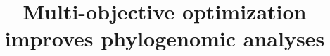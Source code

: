 \documentclass[runningheads]{llncs}
\begin{document}
%
\title{ Multi-objective optimization improves phylogenomic analyses}
\author{}
\institute{}
%
\maketitle              %
%

 
 







%
%
%



%
\end{document}
